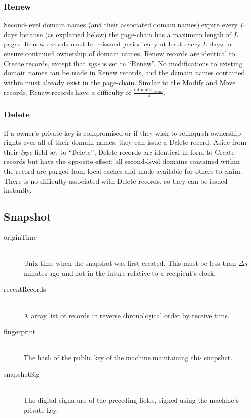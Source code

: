 \subsubsection{Renew}


Second-level domain names (and their associated domain names) expire every $ L $ days because (as explained below) the page-chain has a maximum length of $ L $ pages. Renew records must be reissued periodically at least every $ L $ days to ensure continued ownership of domain names. Renew records are identical to Create records, except that \emph{type} is set to ``Renew''. No modifications to existing domain names can be made in Renew records, and the domain names contained within must already exist in the page-chain. Similar to the Modify and Move records, Renew records have a difficulty of $ \frac{\textrm{difficulty}_{Create}}{4} $.

\subsubsection{Delete}


If a owner's private key is compromised or if they wish to relinquish ownership rights over all of their domain names, they can issue a Delete record. Aside from their \emph{type} field set to ``Delete'', Delete records are identical in form to Create records but have the opposite effect: all second-level domains contained within the record are purged from local caches and made available for others to claim. There is no difficulty associated with Delete records, so they can be issued instantly.

\subsection{Snapshot}

\begin{description}
	\item[originTime] \hfill \\
		Unix time when the snapshot was first created. This must be less than $ \Delta s $ minutes ago and not in the future relative to a recipient's clock.
	\item[recentRecords] \hfill \\
		A array list of records in reverse chronological order by receive time.
	\item[fingerprint] \hfill \\
		The hash of the public key of the machine maintaining this snapshot.
	\item[snapshotSig] \hfill \\
		The digital signature of the preceding fields, signed using the machine's private key.
\end{description}

